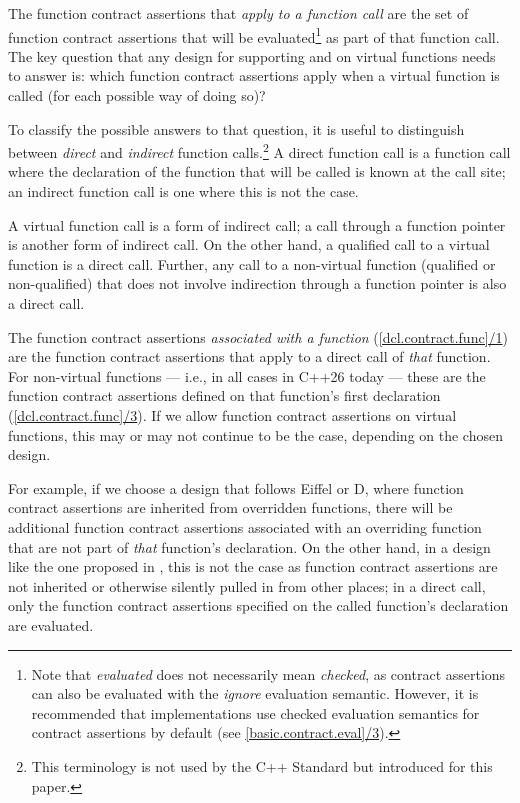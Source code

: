 The function contract assertions that \emph{apply to a function call} are the set of function contract assertions that will be evaluated\footnote{Note that \emph{evaluated} does not necessarily mean \emph{checked}, as contract assertions can also be evaluated with the \emph{ignore} evaluation semantic. However, it is recommended that implementations use checked evaluation semantics for contract assertions by default (see \href{https://eel.is/c++draft/basic.contract\#eval-3}{[basic.contract.eval]/3}).} as part of that function call. The key question that any design for supporting  and  on virtual functions needs to answer is: which function contract assertions apply when a virtual function is called (for each possible way of doing so)?

To classify the possible answers to that question, it is useful to distinguish between \emph{direct} and \emph{indirect} function calls.\footnote{This terminology is not used by the C++ Standard but introduced for this paper.} A direct function call is a function call where the declaration of the function that will be called is known at the call site; an indirect function call is one where this is not the case.

A virtual function call is a form of indirect call; a call through a function pointer is another form of indirect call. On the other hand, a qualified call to a virtual function is a direct call. Further, any call to a non-virtual function (qualified or non-qualified) that does not involve indirection through a function pointer is also a direct call. 

The function contract assertions \emph{associated with a function} (\href{https://eel.is/c++draft/dcl.contract.func#1}{[dcl.contract.func]/1}) are the function contract assertions that apply to a direct call of \emph{that} function. For non-virtual functions  --- i.e., in all cases in C++26 today --- these are the function contract assertions defined on that function's first declaration (\href{https://eel.is/c++draft/dcl.contract.func#3.sentence-1}{[dcl.contract.func]/3}). If we allow function contract assertions on virtual functions, this may or may not continue to be the case, depending on the chosen design.

For example, if we choose a design that follows Eiffel or D, where function contract assertions are inherited from overridden functions, there will be additional function contract assertions associated with an overriding function that are not part of \emph{that} function's declaration. On the other hand, in a design like the one proposed in \cite{P3097R0}, this is not the case as function contract assertions are not inherited or otherwise silently pulled in from other places; in a direct call, only the function contract assertions specified on the called function's declaration are evaluated.

